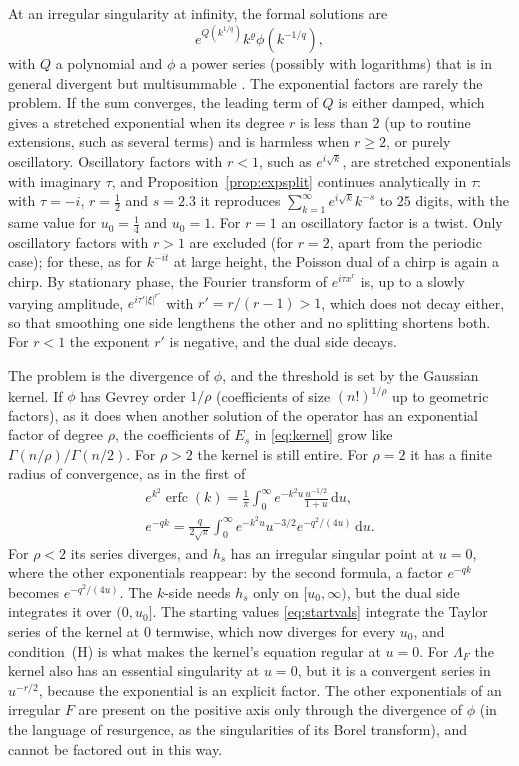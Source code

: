 \documentclass[11pt,reqno]{amsart}
\theoremstyle{definition}
\theoremstyle{remark}
\newcommand{\erfc}{\operatorname{erfc}}
\newcommand{\dd}{\,\mathrm{d}}
\begin{document}
At an irregular singularity at infinity, the formal solutions are
\[
  e^{Q(k^{1/q})}k^{\varrho}\phi(k^{-1/q}),
\]
with $Q$ a polynomial and $\phi$ a power series (possibly with logarithms) that is in general divergent but multisummable
\cite{Bal00}. The exponential factors are rarely the problem. If the sum converges, the leading term of $Q$ is either
damped, which gives a stretched exponential when its degree $r$ is less than $2$ (up to routine extensions, such as
several terms) and is harmless when $r \ge 2$, or purely oscillatory. Oscillatory factors with $r < 1$, such as
$e^{i\sqrt k}$, are stretched exponentials with imaginary $\tau$, and Proposition~\ref{prop:expsplit} continues
analytically in $\tau$: with $\tau = -i$, $r = \frac12$ and $s = 2.3$ it reproduces $\sum_{k=1}^{\infty}e^{i\sqrt k}k^{-s}$
to $25$ digits, with the same value for $u_0 = \frac14$ and $u_0 = 1$. For $r = 1$ an oscillatory factor is a twist.
Only oscillatory factors with $r > 1$ are excluded (for $r = 2$, apart from the periodic case); for these, as for
$k^{-it}$ at large height, the Poisson dual of a chirp is again a chirp. By stationary phase, the Fourier transform of
$e^{i\tau x^r}$ is, up to a slowly varying amplitude, $e^{i\tau'|\xi|^{r'}}$ with $r' = r/(r-1) > 1$, which does not
decay either, so that smoothing one side lengthens the other and no splitting shortens both. For $r < 1$ the exponent
$r'$ is negative, and the dual side decays.

The problem is the divergence of $\phi$, and the threshold is set by the Gaussian kernel. If $\phi$ has Gevrey order
$1/\rho$ (coefficients of size $(n!)^{1/\rho}$ up to geometric factors), as it does when another solution of the
operator has an exponential factor of degree $\rho$, the coefficients of $E_s$ in \eqref{eq:kernel} grow like
$\Gamma(n/\rho)/\Gamma(n/2)$. For $\rho > 2$ the kernel is still entire. For $\rho = 2$ it has a finite radius of
convergence, as in the first of
\begin{gather*}
  e^{k^2}\erfc(k) = \frac1\pi\int_0^\infty e^{-k^2u}\frac{u^{-1/2}}{1+u}\dd u, \\
  e^{-qk} = \frac{q}{2\sqrt\pi}\int_0^\infty e^{-k^2u}u^{-3/2}e^{-q^2/(4u)}\dd u.
\end{gather*}
For $\rho < 2$ its series diverges, and $h_s$ has an irregular singular point at $u = 0$, where the other exponentials
reappear: by the second formula, a factor $e^{-qk}$ becomes $e^{-q^2/(4u)}$. The $k$-side needs $h_s$ only on $[u_0,\infty)$, but the dual side integrates it over $(0,u_0]$. The
starting values \eqref{eq:startvals} integrate the Taylor series of the kernel at $0$ termwise, which now diverges for
every $u_0$, and condition~(H) is what makes the kernel's equation regular at $u = 0$. For $\Lambda_F$ the
kernel also has an essential singularity at $u = 0$, but it is a convergent series in $u^{-r/2}$, because the
exponential is an explicit factor. The other exponentials of an irregular $F$ are present on the positive axis only
through the divergence of $\phi$ (in the language of resurgence, as the singularities of its Borel transform), and
cannot be factored out in this way.
\end{document}
